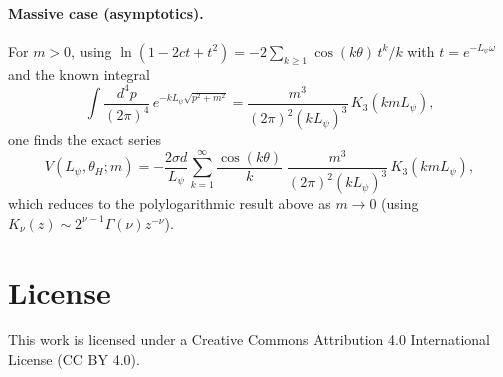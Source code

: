\documentclass[12pt]{article}
\begin{document}
\paragraph{Massive case (asymptotics).}
For $m>0$, using $\ln(1-2ct+t^2)= -2\sum_{k\ge 1} \cos(k\theta)\, t^k/k$ with $t=e^{-L_\psi \omega}$ and the known integral
\begin{equation}
\int \!\frac{d^4p}{(2\pi)^4}\, e^{-k L_\psi \sqrt{p^2 + m^2}}
= \frac{m^3}{(2\pi)^2 (k L_\psi)^3}\, K_3(k m L_\psi),
\end{equation}
one finds the exact series
\begin{equation}
V(L_\psi,\theta_H;m)
= - \frac{2\sigma d}{L_\psi} \sum_{k=1}^\infty \frac{\cos(k\theta)}{k}\;
\frac{m^3}{(2\pi)^2 (k L_\psi)^3}\, K_3(k m L_\psi),
\end{equation}
which reduces to the polylogarithmic result above as $m\to 0$ (using $K_\nu(z)\sim 2^{\nu-1}\Gamma(\nu) z^{-\nu}$).


\section*{License}
This work is licensed under a Creative Commons Attribution 4.0 International License (CC BY 4.0).
\end{document}
